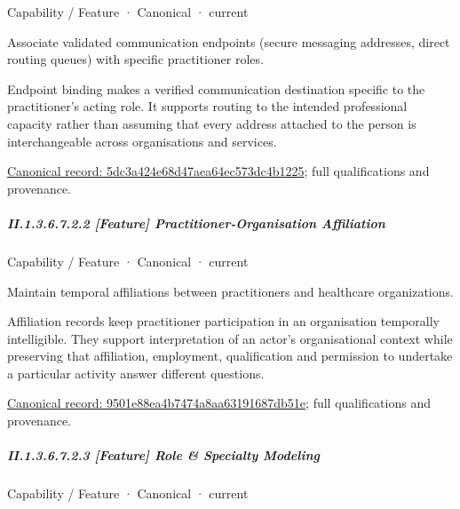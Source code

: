 \label{element:5dc3a424e68d47aea64ec573dc4b1225}
{\small Capability / Feature · Canonical · current}\par

Associate validated communication endpoints (secure messaging addresses, direct routing queues) with specific practitioner roles.



Endpoint binding makes a verified communication destination specific to the practitioner's acting role. It supports routing to the intended professional capacity rather than assuming that every address attached to the person is interchangeable across organisations and services.


{\footnotesize \href{../../../../continuum/strategy/capability/feature/5dc3a424e68d47aea64ec573dc4b1225.md}{Canonical record: 5dc3a424e68d47aea64ec573dc4b1225}; full qualifications and provenance.}\par
\subparagraph*{II.1.3.6.7.2.2 [Feature] Practitioner-Organisation Affiliation}
\label{navigation:II.1.3.6.7.2.2}

\label{element:9501e88ea4b7474a8aa63191687db51e}
{\small Capability / Feature · Canonical · current}\par

Maintain temporal affiliations between practitioners and healthcare organizations.



Affiliation records keep practitioner participation in an organisation temporally intelligible. They support interpretation of an actor's organisational context while preserving that affiliation, employment, qualification and permission to undertake a particular activity answer different questions.


{\footnotesize \href{../../../../continuum/strategy/capability/feature/9501e88ea4b7474a8aa63191687db51e.md}{Canonical record: 9501e88ea4b7474a8aa63191687db51e}; full qualifications and provenance.}\par
\subparagraph*{II.1.3.6.7.2.3 [Feature] Role \& Specialty Modeling}
\label{navigation:II.1.3.6.7.2.3}

\label{element:ef859d4934514f4eb601c6abf9708760}
{\small Capability / Feature · Canonical · current}\par

